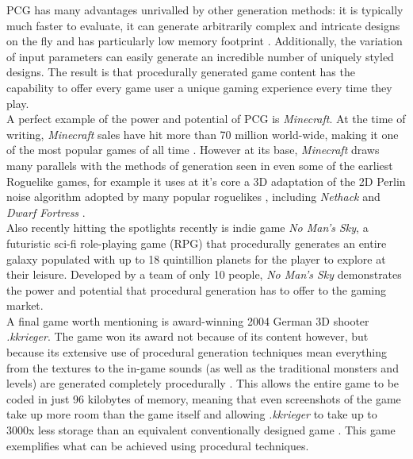 \documentclass[12pt,a4paper]{article}
\begin{document}
PCG has many advantages unrivalled by other generation methods: it is typically much faster to evaluate, it can generate arbitrarily complex and intricate designs on the fly and has particularly low memory footprint \cite{surveyPNF}. Additionally, the variation of input parameters can easily generate an incredible number of uniquely styled designs. The result is that procedurally generated game content has the capability to offer every game user a unique gaming experience every time they play. \\


A perfect example of the power and potential of PCG is \emph{Minecraft}. At the time of writing, \emph{Minecraft} sales have hit more than 70 million world-wide, making it one of the most popular games of all time \cite{ukie}. However at its base, \emph{Minecraft} draws many parallels with the methods of generation seen in even some of the earliest Roguelike games, for example it uses at it's core a 3D adaptation of the 2D Perlin noise algorithm adopted by many popular roguelikes \cite{notch}, including \emph{Nethack} and \emph{Dwarf Fortress} \cite{Dunhack}.\\

Also recently hitting the spotlights recently is indie game \emph{No Man's Sky}, a futuristic sci-fi role-playing game (RPG) that procedurally generates an entire galaxy populated with up to 18 quintillion planets for the player to explore at their leisure. Developed by a team of only 10 people, \emph{No Man's Sky} demonstrates the power and potential that procedural generation has to offer to the gaming market. \\

A final game worth mentioning is award-winning 2004 German 3D shooter \emph{.kkrieger}. The game won its award not because of its content however, but because its extensive use of procedural generation techniques mean everything from the textures to the in-game sounds (as well as the traditional monsters and levels) are generated completely procedurally \cite{kkrieger}. This allows the entire game to be coded in just 96 kilobytes of memory, meaning that even screenshots of the game take up more room than the game itself and allowing \emph{.kkrieger} to take up to 3000x less storage than an equivalent conventionally designed game \cite{kkrieger}. This game exemplifies what can be achieved using procedural techniques.\\
\end{document}
